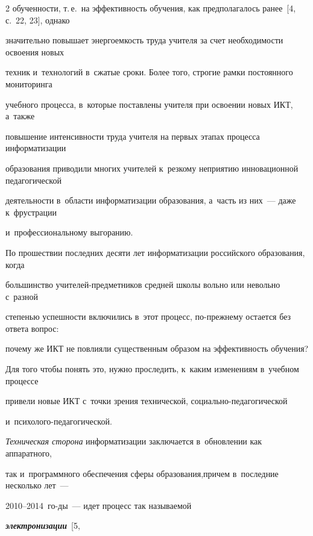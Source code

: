\begin{multicols}{2}
обучен\-ности, т.\,е.\ на эффективность обучения, как предполагалось ранее~[4, с.~22, 23], однако


значительно повышает энергоемкость труда учителя за счет необходимости освоения новых


техник и~технологий в~сжатые сроки. Более того, строгие рамки постоянного мониторинга


учебного процесса, в~которые поставлены учителя при освоении новых ИКТ, а~также


повышение интенсивности труда учителя на первых этапах процесса информатизации


образования приводили многих учителей к~резкому неприятию инновационной педагогической


деятельности в~области информатизации образования, а~часть из них~--- даже к~фрустрации


и~профессиональному выгоранию.





  По прошествии последних десяти лет информатизации российского образования, когда


большинство учи\-те\-лей-пред\-мет\-ни\-ков средней школы вольно или невольно с~разной


степенью успешности включились в~этот процесс, по-преж\-не\-му остается без ответа вопрос:


почему же ИКТ не повлияли существенным образом на эффективность обучения?





  Для того чтобы понять это, нужно проследить, к~каким изменениям в~учебном процессе


привели новые ИКТ с~точки зрения технической, со\-ци\-аль\-но-пе\-да\-го\-ги\-че\-ской


  и~пси\-хо\-ло\-го-пе\-да\-го\-ги\-ческой.





  \textit{Техническая сторона} информатизации заклю\-чается в~обновлении как аппаратного,


так и~программного обеспечения сферы образования,\linebreak причем в~последние несколько лет~---


2010--2014~го-\linebreak ды~--- идет процесс так называемой


{\bfseries\textit{электро\-ни\-зации}}~[5,



\end{multicols}
